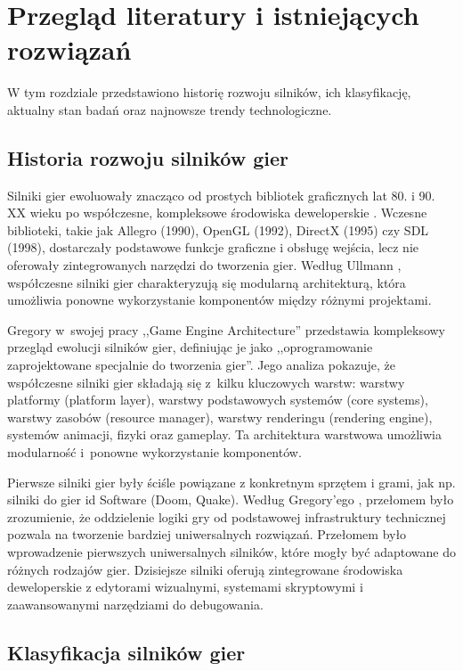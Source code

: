 \clearpage
\section{Przegląd literatury i istniejących rozwiązań}

W tym rozdziale przedstawiono historię rozwoju silników, ich klasyfikację, aktualny stan badań oraz najnowsze trendy technologiczne.

\subsection{Historia rozwoju silników gier}
Silniki gier ewoluowały znacząco od prostych bibliotek graficznych 
lat 80. i 90. XX wieku po współczesne, kompleksowe środowiska 
deweloperskie \cite{gregory2018game}. Wczesne biblioteki, takie 
jak Allegro (1990), OpenGL (1992), DirectX (1995) czy SDL (1998), 
dostarczały podstawowe funkcje graficzne i obsługę wejścia, 
lecz nie oferowały zintegrowanych narzędzi do tworzenia gier. 
Według Ullmann \cite{ullmann2022game}, współczesne silniki 
gier charakteryzują się modularną architekturą, która umożliwia 
ponowne wykorzystanie komponentów między różnymi projektami.

Gregory \cite{gregory2018game} w~swojej pracy ,,Game Engine Architecture''
przedstawia kompleksowy przegląd ewolucji silników gier, definiując je jako
,,oprogramowanie zaprojektowane specjalnie do tworzenia gier''.
Jego analiza pokazuje, że współczesne silniki gier składają się z~kilku
kluczowych warstw: warstwy platformy (platform layer),
warstwy podstawowych systemów (core systems), warstwy zasobów
(resource manager), warstwy renderingu (rendering engine),
systemów animacji, fizyki oraz gameplay.
Ta architektura warstwowa umożliwia modularność i~ponowne
wykorzystanie komponentów.

Pierwsze silniki gier były ściśle powiązane z konkretnym sprzętem 
i grami, jak np. silniki do gier id Software (Doom, Quake). 
Według Gregory'ego \cite{gregory2018game}, przełomem było 
zrozumienie, że oddzielenie logiki gry od podstawowej 
infrastruktury technicznej pozwala na tworzenie bardziej 
uniwersalnych rozwiązań. Przełomem było wprowadzenie pierwszych 
uniwersalnych silników, które mogły być adaptowane do różnych 
rodzajów gier. Dzisiejsze silniki oferują zintegrowane środowiska 
deweloperskie z edytorami wizualnymi, systemami skryptowymi i 
zaawansowanymi narzędziami do debugowania.

\subsection{Klasyfikacja silników gier}

